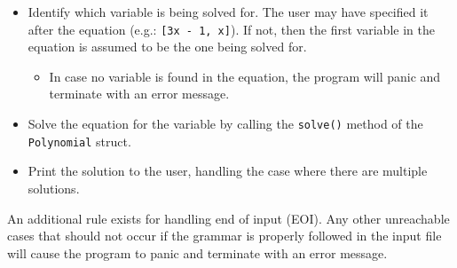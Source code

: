 \begin{itemize}
\begin{itemize}
        \item Identify which variable is being solved for. The user may have specified it after the equation (e.g.: \texttt{[3x - 1, x]}). If not, then the first variable in the equation is assumed to be the one being solved for.
        \begin{itemize}
            \item In case no variable is found in the equation, the program will panic and terminate with an error message. 
        \end{itemize}
        \item Solve the equation for the variable by calling the \verb|solve()| method of the \verb|Polynomial| struct.
        \item Print the solution to the user, handling the case where there are multiple solutions.
    \end{itemize}
\end{itemize}

An additional rule exists for handling end of input (EOI). Any other unreachable cases that should not occur if the grammar is properly followed in the input file will cause the program to panic and terminate with an error message.

